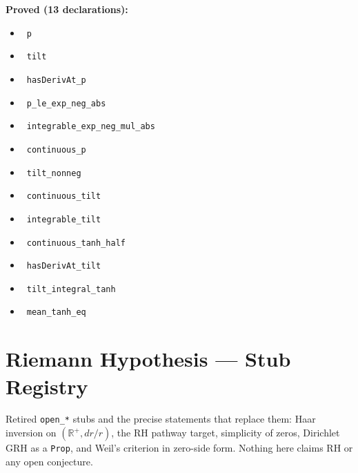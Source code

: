 \documentclass{report}
\theoremstyle{definition}
\begin{document}
\noindent\textbf{Proved (13 declarations):}
\begin{itemize}
  \item {}\leanok\ \texttt{p}
  \item {}\leanok\ \texttt{tilt}
  \item {}\leanok\ \texttt{hasDerivAt\_p}
  \item {}\leanok\ \texttt{p\_le\_exp\_neg\_abs}
  \item {}\leanok\ \texttt{integrable\_exp\_neg\_mul\_abs}
  \item {}\leanok\ \texttt{continuous\_p}
  \item {}\leanok\ \texttt{tilt\_nonneg}
  \item {}\leanok\ \texttt{continuous\_tilt}
  \item {}\leanok\ \texttt{integrable\_tilt}
  \item {}\leanok\ \texttt{continuous\_tanh\_half}
  \item {}\leanok\ \texttt{hasDerivAt\_tilt}
  \item {}\leanok\ \texttt{tilt\_integral\_tanh}
  \item {}\leanok\ \texttt{mean\_tanh\_eq}
\end{itemize}

\section{Riemann Hypothesis --- Stub Registry}
Retired \texttt{open\_*} stubs and the precise statements that replace them: Haar inversion on $(\mathbb{R}^+,dr/r)$, the RH pathway target, simplicity of zeros, Dirichlet GRH as a \texttt{Prop}, and Weil's criterion in zero-side form. Nothing here claims RH or any open conjecture.
\end{document}
